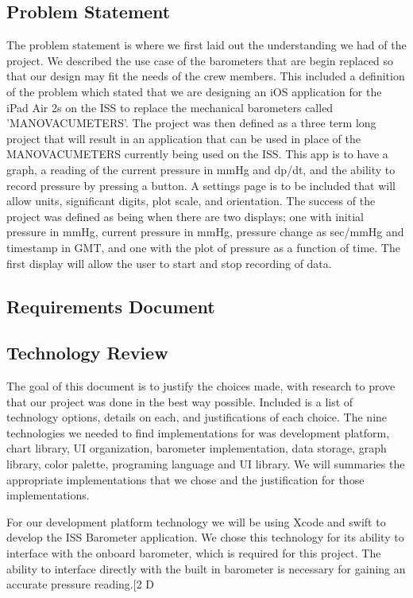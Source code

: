 \documentclass[onecolumn, draftclsnofoot,10pt, compsoc]{IEEEtran}
\begin{document}
\subsection{Problem Statement}
The problem statement is where we first laid out the understanding we had of the project.
We described the use case of the barometers that are begin replaced so that our design may fit the needs of the crew members.
This included a definition of the problem which stated that we are designing an iOS application for the iPad Air 2s on the ISS to replace the mechanical barometers called 'MANOVACUMETERS'.
The project was then defined as a three term long project that will result in an application that can be used in place of the MANOVACUMETERS currently being used on the ISS.
This app is to have a graph, a reading of the current pressure in mmHg and dp/dt, and the ability to record pressure by pressing a button.
A settings page is to be included that will allow units, significant digits, plot scale, and orientation.
The success of the project was defined as being when there are two displays; one with initial pressure in mmHg, current pressure in mmHg, pressure change as sec/mmHg and timestamp in GMT, and one with the plot of pressure as a function of time.
The first display will allow the user to start and stop recording of data.
\subsection{Requirements Document}

\subsection{Technology Review}
The goal of this document is to justify the choices made, with research to prove that our project was done in the best way possible.
Included is a list of technology options, details on each, and justifications of each choice.
The nine technologies we needed to find implementations  for was development platform, chart library, UI organization, barometer implementation, data storage, graph library, color palette, programing language and UI library.
We will summaries the appropriate implementations that we chose and the justification for those implementations.

For our development platform technology we will be using Xcode and swift to develop the ISS Barometer application.
We chose this technology for its ability to interface with the onboard barometer, which is required for this project.
The ability to interface directly with the built in barometer is necessary for gaining an accurate pressure reading.[2 D
\end{document}
